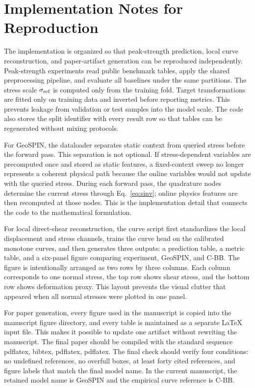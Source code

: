 \documentclass[journal]{IEEEtran}
\begin{document}
\section{Implementation Notes for Reproduction}
The implementation is organized so that peak-strength prediction, local curve reconstruction, and paper-artifact generation can be reproduced independently. Peak-strength experiments read public benchmark tables, apply the shared preprocessing pipeline, and evaluate all baselines under the same partitions. The stress scale $\sigma_{\rm ref}$ is computed only from the training fold. Target transformations are fitted only on training data and inverted before reporting metrics. This prevents leakage from validation or test samples into the model scale. The code also stores the split identifier with every result row so that tables can be regenerated without mixing protocols.

For GeoSPIN, the dataloader separates static context from queried stress before the forward pass. This separation is not optional. If stress-dependent variables are precomputed once and stored as static features, a fixed-context sweep no longer represents a coherent physical path because the online variables would not update with the queried stress. During each forward pass, the quadrature nodes determine the current stress through Eq.~\eqref{eq:sinv}; online physics features are then recomputed at those nodes. This is the implementation detail that connects the code to the mathematical formulation.

For local direct-shear reconstruction, the curve script first standardizes the local displacement and stress channels, trains the curve head on the calibrated monotone curves, and then generates three outputs: a prediction table, a metric table, and a six-panel figure comparing experiment, GeoSPIN, and C-BB. The figure is intentionally arranged as two rows by three columns. Each column corresponds to one normal stress, the top row shows shear stress, and the bottom row shows deformation proxy. This layout prevents the visual clutter that appeared when all normal stresses were plotted in one panel.

For paper generation, every figure used in the manuscript is copied into the manuscript figure directory, and every table is maintained as a separate LaTeX input file. This makes it possible to update one artifact without rewriting the manuscript. The final paper should be compiled with the standard sequence pdflatex, bibtex, pdflatex, pdflatex. The final check should verify four conditions: no undefined references, no overfull boxes, at least forty cited references, and figure labels that match the final model name. In the current manuscript, the retained model name is GeoSPIN and the empirical curve reference is C-BB.
\end{document}
